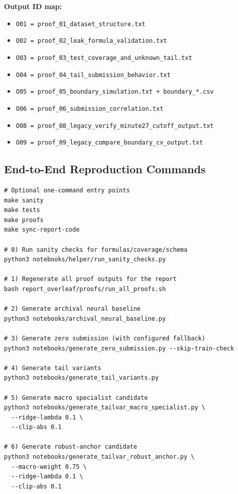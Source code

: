 \textbf{Output ID map:}
\begin{itemize}[leftmargin=1.5em]
  \item \texttt{O01 = proof\_01\_dataset\_structure.txt}
  \item \texttt{O02 = proof\_02\_leak\_formula\_validation.txt}
  \item \texttt{O03 = proof\_03\_test\_coverage\_and\_unknown\_tail.txt}
  \item \texttt{O04 = proof\_04\_tail\_submission\_behavior.txt}
  \item \texttt{O05 = proof\_05\_boundary\_simulation.txt + boundary\_*.csv}
  \item \texttt{O06 = proof\_06\_submission\_correlation.txt}
  \item \texttt{O08 = proof\_08\_legacy\_verify\_minute27\_cutoff\_output.txt}
  \item \texttt{O09 = proof\_09\_legacy\_compare\_boundary\_cv\_output.txt}
\end{itemize}
\normalsize

\subsection{End-to-End Reproduction Commands}
\begin{Verbatim}[fontsize=\small]
# Optional one-command entry points
make sanity
make tests
make proofs
make sync-report-code

# 0) Run sanity checks for formulas/coverage/schema
python3 notebooks/helper/run_sanity_checks.py

# 1) Regenerate all proof outputs for the report
bash report_overleaf/proofs/run_all_proofs.sh

# 2) Generate archival neural baseline
python3 notebooks/archival_neural_baseline.py

# 3) Generate zero submission (with configured fallback)
python3 notebooks/generate_zero_submission.py --skip-train-check

# 4) Generate tail variants
python3 notebooks/generate_tail_variants.py

# 5) Generate macro specialist candidate
python3 notebooks/generate_tailvar_macro_specialist.py \
  --ridge-lambda 0.1 \
  --clip-abs 0.1

# 6) Generate robust-anchor candidate
python3 notebooks/generate_tailvar_robust_anchor.py \
  --macro-weight 0.75 \
  --ridge-lambda 0.1 \
  --clip-abs 0.1
\end{Verbatim}
